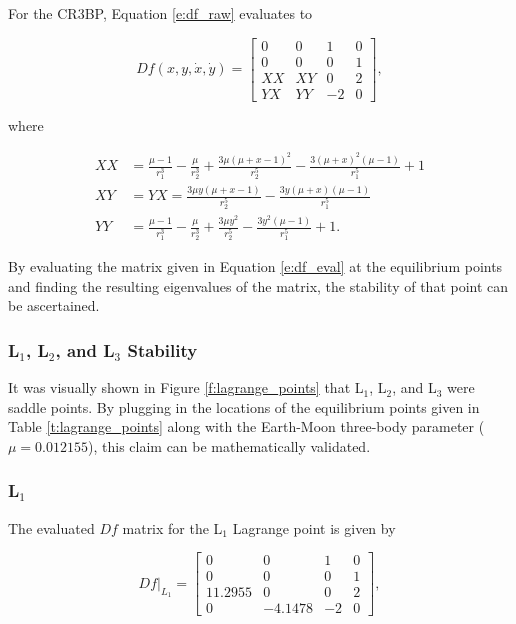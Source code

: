 \documentclass[11pt]{article} %
\begin{document}
\noindent 
For the CR3BP, Equation \ref{e:df_raw} evaluates to 

\doublespacing
\begin{equation}
	\label{e:df_eval}
	Df\left(x,y,\dot{x},\dot{y}\right) = 
	\begin{bmatrix} 
		0 & 0 & 1  & 0 \\ 
		0 & 0 & 0 & 1 \\
		XX & XY & 0 & 2 \\
		YX & YY & -2 & 0
	\end{bmatrix},
\end{equation}
\singlespacing

\noindent
where

\begin{align}
	XX &= \frac{\mu - 1}{r_1^3} - \frac{\mu}{r_2^3} + \frac{3\mu\left(\mu+x-1\right)^2}{r_2^5} - \frac{3\left(\mu+x\right)^2\left(\mu-1\right)}{r_1^5} + 1 \\
	XY &= YX = \frac{3\mu y\left(\mu+x-1\right)}{r_2^5} - \frac{3y\left(\mu+x\right)\left(\mu-1\right)}{r_1^5} \\
	YY &= \frac{\mu - 1}{r_1^3} - \frac{\mu}{r_2^3} + \frac{3\mu y^2}{r_2^5} - \frac{3y^2\left(\mu-1\right)}{r_1^5} + 1.
\end{align}

\noindent
By evaluating the matrix given in Equation \ref{e:df_eval} at the equilibrium points and finding the resulting eigenvalues of the matrix, the stability of that point can be ascertained.

\subsubsection{L$_1$, L$_2$, and L$_3$ Stability}
It was visually shown in Figure \ref{f:lagrange_points} that L$_1$, L$_2$, and L$_3$ were saddle points. By plugging in the locations of the equilibrium points given in Table \ref{t:lagrange_points} along with the Earth-Moon three-body parameter ($\mu = 0.012155$), this claim can be mathematically validated. 

\subsubsection*{L$_1$}
The evaluated $Df$ matrix for the L$_1$ Lagrange point is given by

\doublespacing
\begin{equation}
	\label{e:df_eval_L1}
	Df|_{L_1} = 
	\begin{bmatrix} 
		0 & 0 & 1  & 0 \\ 
		0 & 0 & 0 & 1 \\
		11.2955 & 0 & 0 & 2 \\
		0 & -4.1478 & -2 & 0
	\end{bmatrix},
\end{equation}
\singlespacing
\end{document}
